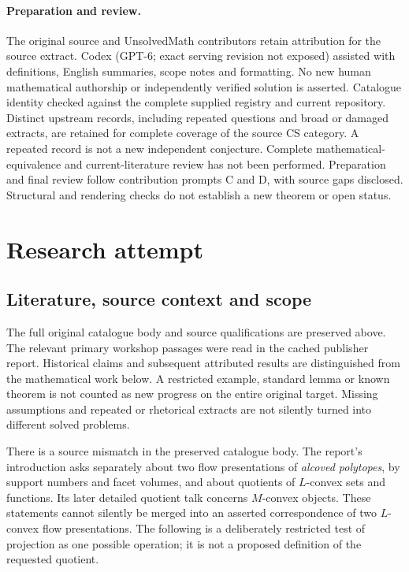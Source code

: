 \documentclass[11pt]{article}
\begin{document}
\paragraph{Preparation and review.}
The original source and UnsolvedMath contributors retain attribution for the source extract. Codex (GPT-6; exact serving revision not exposed) assisted with definitions, English summaries, scope notes and formatting. No new human mathematical authorship or independently verified solution is asserted. Catalogue identity checked against the complete supplied registry and current repository. Distinct upstream records, including repeated questions and broad or damaged extracts, are retained for complete coverage of the source CS category. A repeated record is not a new independent conjecture. Complete mathematical-equivalence and current-literature review has not been performed. Preparation and final review follow contribution prompts C and D, with source gaps disclosed. Structural and rendering checks do not establish a new theorem or open status.
\label{end:statement}

\section{Research attempt}
\subsection{Literature, source context and scope}
The full original catalogue body and source qualifications are preserved above. The relevant primary workshop passages were read in the cached publisher report. Historical claims and subsequent attributed results are distinguished from the mathematical work below. A restricted example, standard lemma or known theorem is not counted as new progress on the entire original target. Missing assumptions and repeated or rhetorical extracts are not silently turned into different solved problems.

There is a source mismatch in the preserved catalogue body. The report's introduction asks separately about two flow presentations of \emph{alcoved polytopes}, by support numbers and facet volumes, and about quotients of $L$-convex sets and functions. Its later detailed quotient talk concerns $M$-convex objects. These statements cannot silently be merged into an asserted correspondence of two $L$-convex flow presentations. The following is a deliberately restricted test of projection as one possible operation; it is not a proposed definition of the requested quotient.
\end{document}
